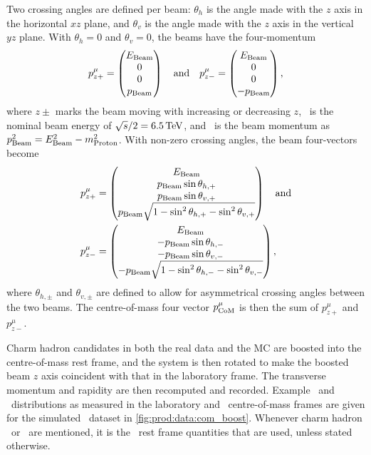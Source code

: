 Two crossing angles are defined per beam: $\theta_{h}$ is the angle made with 
the $z$ axis in the horizontal $xz$ plane, and $\theta_{v}$ is the angle made 
with the $z$ axis in the vertical $yz$ plane.
With $\theta_{h} = 0$ and $\theta_{v} = 0$, the beams have the four-momentum
\begin{equation}
  p_{z+}^{\mu} = \begin{pmatrix}E_{\textnormal{Beam}}\\0\\0\\p_{\textnormal{Beam}}\end{pmatrix}
    \quad\text{and}\quad
  p_{z-}^{\mu} = \begin{pmatrix}E_{\textnormal{Beam}}\\0\\0\\-p_{\textnormal{Beam}}\end{pmatrix},
\end{equation}
where $z\pm$ marks the beam moving with increasing or decreasing $z$, \Ebeam\ 
is the nominal beam energy of $\sqrts/2 = \SI{6.5}{\TeV}$, and \pbeam\ is the 
beam momentum as $p_{\textnormal{Beam}}^{2} = E_{\textnormal{Beam}}^{2} - m_{\text{Proton}}^{2}$.
With non-zero crossing angles, the beam four-vectors become
\begin{align}
  p_{z+}^{\mu} &= \begin{pmatrix}
    E_{\textnormal{Beam}}\\
    p_{\textnormal{Beam}}\sin{\theta_{h,+}}\\
    p_{\textnormal{Beam}}\sin{\theta_{v,+}}\\
    p_{\textnormal{Beam}}\sqrt{1 - \sin^{2}{\theta_{h,+}} - \sin^{2}{\theta_{v,+}}}
  \end{pmatrix}\quad\text{and}\nonumber\\
  p_{z-}^{\mu} &= \begin{pmatrix}
    E_{\textnormal{Beam}}\\
    -p_{\textnormal{Beam}}\sin{\theta_{h,-}}\\
    -p_{\textnormal{Beam}}\sin{\theta_{v,-}}\\
    -p_{\textnormal{Beam}}\sqrt{1 - \sin^{2}{\theta_{h,-}} - \sin^{2}{\theta_{v,-}}}
  \end{pmatrix},
\end{align}
where $\theta_{h,\pm}$ and $\theta_{v,\pm}$ are defined to allow for 
asymmetrical crossing angles between the two beams.
The centre-of-mass four vector $p_{\text{CoM}}^{\mu}$ is then the sum of 
$p_{z+}^{\mu}$ and $p_{z-}^{\mu}$.

Charm hadron candidates in both the real data and the \ac{MC} are boosted into 
the centre-of-mass rest frame, and the system is then rotated to make the 
boosted beam $z$ axis coincident with that in the laboratory frame.
The transverse momentum and rapidity are then recomputed and recorded.
Example \pT\ and \rapidity\ distributions as measured in the laboratory and 
\pp\ centre-of-mass frames are given for the simulated \DstToDzpi\ dataset in 
\cref{fig:prod:data:com_boost}.
Whenever charm hadron \pT\ or \rapidity\ are mentioned, it is the \pp\ rest 
frame quantities that are used, unless stated otherwise.

